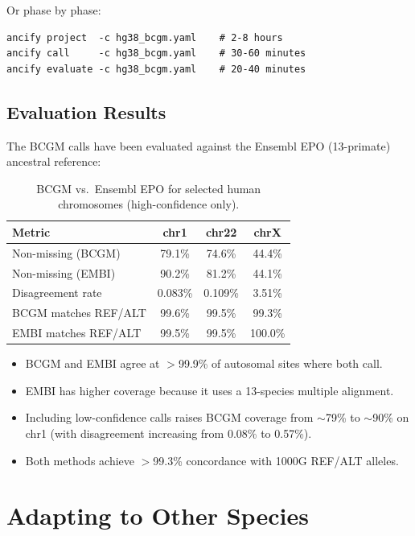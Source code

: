 \documentclass[11pt,a4paper]{article}
\begin{document}
Or phase by phase:
\begin{lstlisting}[style=bashstyle]
ancify project  -c hg38_bcgm.yaml    # 2-8 hours
ancify call     -c hg38_bcgm.yaml    # 30-60 minutes
ancify evaluate -c hg38_bcgm.yaml    # 20-40 minutes
\end{lstlisting}

\subsection{Evaluation Results}

The BCGM calls have been evaluated against the Ensembl EPO (13-primate) ancestral reference:

\begin{table}[H]
\centering
\caption{BCGM vs.\ Ensembl EPO for selected human chromosomes (high-confidence only).}
\begin{tabular}{lccc}
\toprule
\textbf{Metric} & \textbf{chr1} & \textbf{chr22} & \textbf{chrX} \\
\midrule
Non-missing (BCGM) & 79.1\% & 74.6\% & 44.4\% \\
Non-missing (EMBI) & 90.2\% & 81.2\% & 44.1\% \\
Disagreement rate & 0.083\% & 0.109\% & 3.51\% \\
BCGM matches REF/ALT & 99.6\% & 99.5\% & 99.3\% \\
EMBI matches REF/ALT & 99.5\% & 99.5\% & 100.0\% \\
\bottomrule
\end{tabular}
\end{table}

\begin{notebox}
\begin{itemize}
    \item BCGM and EMBI agree at $>$99.9\% of autosomal sites where both call.
    \item EMBI has higher coverage because it uses a 13-species multiple alignment.
    \item Including low-confidence calls raises BCGM coverage from $\sim$79\% to $\sim$90\% on chr1 (with disagreement increasing from 0.08\% to 0.57\%).
    \item Both methods achieve $>$99.3\% concordance with 1000G REF/ALT alleles.
\end{itemize}
\end{notebox}


\section{Adapting to Other Species}
\label{sec:other_species}
\end{document}
